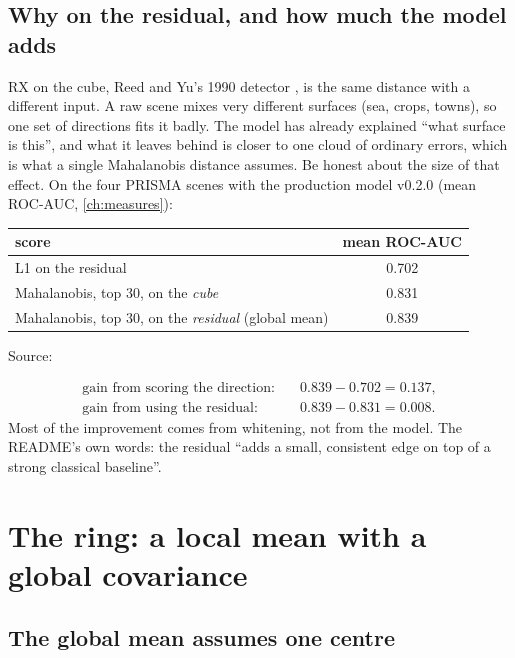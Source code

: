 \subsection{Why on the residual, and how much the model adds}

RX on the cube, Reed and Yu's 1990 detector \citep{reed1990adaptive}, is the same distance with a different input. A raw scene mixes very different surfaces (sea,
crops, towns), so one set of directions fits it badly. The model has already explained ``what surface is
this'', and what it leaves behind is closer to one cloud of ordinary errors, which is what a single
Mahalanobis distance assumes. Be honest about the size of that effect. On the four PRISMA scenes with the
production model v0.2.0 (mean ROC-AUC, \cref{ch:measures}):
\begin{center}\small
\begin{tabular}{@{}lc@{}}
\toprule
score & mean ROC-AUC\\
\midrule
L1 on the residual & 0.702\\
Mahalanobis, top 30, on the \emph{cube} & 0.831\\
Mahalanobis, top 30, on the \emph{residual} (global mean) & 0.839\\
\bottomrule
\end{tabular}

\smallskip
Source: 
\end{center}
\begin{align*}
\text{gain from scoring the direction:} &\quad 0.839-0.702 = 0.137,\\
\text{gain from using the residual:} &\quad 0.839-0.831 = 0.008.
\end{align*}
Most of the improvement comes from whitening, not from the model. The README's own words: the residual
``adds a small, consistent edge on top of a strong classical baseline''.

\section{The ring: a local mean with a global covariance}\label{sec:residualmaha:ring}

\subsection{The global mean assumes one centre}

